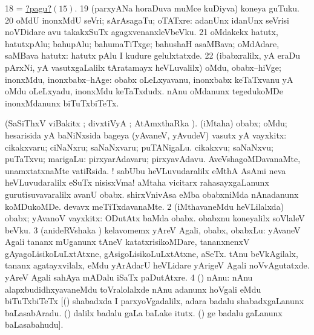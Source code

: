 \num{18}  = \hyperlink{onepagu15}{?pagu?\((15)\)}. 
\num{19}  (parxyANa horaDuva muMce kuDiyva) koneya guTuku. 
\num{20}  oMdU inonxMdU seVri; sArAsagaTu; oTATxre:  adanUnx idanUnx seVrisi noVDidare avu takakxSuTx agagxvenanxleVbeVku. 
\num{21}  oMdakekx hatutx, hatutxpAlu; bahupAlu; bahumaTiTxge; bahushaH asaMBava; oMdAdare, saMBava hatutx:  hatutx pAlu I kudure gelulxtatxde. 
\num{22}  (ibabxralilx, yA eraDu pArxNi, yA vasutxgaLalilx tAratamayx heVLuvalilx) oMdu, obabx--hiVge; inonxMdu, inonxbabx--hAge:  obabx oLeLxyavanu, inonxbabx keTaTxvanu yA oMdu oLeLxyadu, inonxMdu keTaTxdudx.  nAnu oMdanunx tegedukoMDe inonxMdanunx biTuTxbiTeTx. 
\enum
\emng
\eentry

\bentry
{}
\gl{\sanA}
\bmng
(SaSiThxV viBakitx ; divxtiVyA ; AtAmxthaRka ). 
\bnum
{} (iMtaha) obabx; oMdu; hesarisida yA baNiNxsida bageya (yAvaneV, yAvudeV) vasutx yA vayxkitx:  
\banum
{} cikakxvaru; ciNaNxru; saNaNxvaru; puTANigaLu. 
 cikakxvu; saNaNxvu; puTaTxvu; marigaLu:  pirxyarAdavaru; pirxyavAdavu.  AveVshagoMDavanaMte, unamxtatxnaMte vatiRsida. ! sabUbu heVLuvudaralilx eMthA AsAmi neva heVLuvudaralilx eSuTx nisisxVma!  aMtaha vicitarx rahasayxgaLanunx gurutisuvavaralilx avanU obabx.  shirxVnivAsa eMba obabxniMda nAnadanunx koMDukoMDe.  devavx meTiTxdavanaMte. 
\eanum
\numie
\num{2} (iMthavaneMdu heVLilalxda) obabx; yAvanoV vayxkitx:  ODutAtx baMda obabx.  obabxnu koneyalilx soVlaleV beVku. 
\num{3} (anideRVshaka \sanA) kelavomemx yAreV Agali, obabx, obabxLu:  yAvaneV Agali tananx mUganunx tAneV katatxrisikoMDare, tananxnenxV gAyagoLisikoLuLxtAtxne, gAsigoLisikoLuLxtAtxne, aSeTx.  tAnu beVkAgilalx, tananx agatayxvilalx, eMdu yArAdarU heVLidare yArigeV Agali noVvAgutatxde.  yAreV Agali sahAya mADalu iSaTx paDutAtxre. 
\num{4} (\AmA) nAnu:  nAnu alapxbudidhxyavaneMdu toVralolalxde nAnu adanunx hoVgali eMdu biTuTxbiTeTx [(\birx)  shabadxda I parxyoVgadalilx, adara badalu  shabadxgaLanunx baLasabAradu. (\birx) \pArxparx dalilx  badalu  gaLa baLake itutx. (\ame)  ge badalu  gaLanunx baLasabahudu]. 
\enum
\emng

